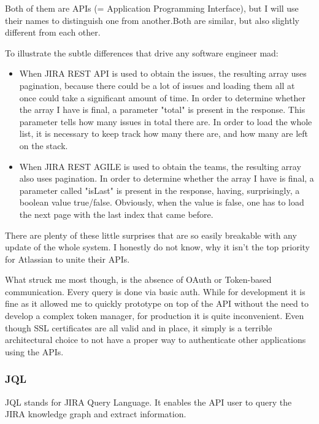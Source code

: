 Both of them are APIs (= Application Programming Interface), but I will use their names to distinguish one from another.Both are similar, but also slightly different from each other. 

To illustrate the subtle differences that drive any software engineer mad:

\begin{itemize}
	\item When JIRA REST API is used to obtain the issues, the resulting array uses pagination, because there could be a lot of issues and loading them all at once could take a significant amount of time. In order to determine whether the array I have is final, a parameter "total" is present in the response. This parameter tells how many issues in total there are. In order to load the whole list, it is necessary to keep track how many there are, and how many are left on the stack.
	
	\item When JIRA REST AGILE is used to obtain the teams, the resulting array also uses pagination. In order to determine whether the array I have is final, a parameter called "isLast" is present in the response, having, surprisingly, a boolean value true/false. Obviously, when the value is false, one has to load the next page with the last index that came before.
\end{itemize}

There are plenty of these little surprises that are so easily breakable with any update of the whole system. I honestly do not know, why it isn't the top priority for Atlassian to unite their APIs.

What struck me most though, is the absence of OAuth or Token-based communication. Every query is done via basic auth. While for development it is fine as it allowed me to quickly prototype on top of the API without the need to develop a complex token manager, for production it is quite inconvenient. Even though SSL certificates are all valid and in place, it simply is a terrible architectural choice to not have a proper way to authenticate other applications using the APIs.

\subsubsection{JQL}

JQL stands for JIRA Query Language\cite{jql}. It enables the API user to query the JIRA knowledge graph and extract information.

